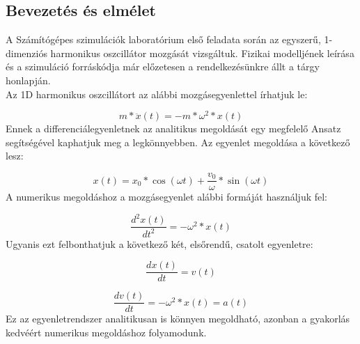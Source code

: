 \begin{multicols}{2}
\section{Bevezetés és elmélet} \label{sec:1}
A Számítógépes szimulációk laboratórium első feladata során az egyszerű, 1-dimenziós harmonikus oszcillátor mozgását vizsgáltuk. Fizikai modelljének leírása és a szimuláció forráskódja már előzetesen a rendelkezésünkre állt a tárgy honlapján\cite{szamszin}. \\
Az 1D harmonikus oszcillátort az alábbi mozgásegyenlettel írhatjuk le:

\begin{equation} \label{eq:1.1}
    m * \ddot{x} \left( t \right)  = - m * \omega^{2} * x \left( t \right)
\end{equation}
Ennek a differenciálegyenletnek az analitikus megoldását egy megfelelő Ansatz segítségével kaphatjuk meg a legkönnyebben. Az egyenlet megoldása a következő lesz:

\begin{equation} \label{eq:1.2}
    x \left( t \right)  = x_{0} * \cos(\omega t) + \frac{v_{0}}{\omega} * \sin(\omega t)
\end{equation}
A numerikus megoldáshoz a mozgásegyenlet alábbi formáját használjuk fel:

\begin{equation} \label{eq:1.3}
    \frac{d^{2} x \left( t \right) }{d t^{2}} = - \omega^{2} * x \left( t \right) 
\end{equation}
Ugyanis ezt felbonthatjuk a következő két, elsőrendű, csatolt egyenletre:

\begin{equation} \label{eq:1.4}
    \frac{dx \left( t \right)}{dt} = v \left( t \right) 
\end{equation}

\begin{equation} \label{eq:1.5}
    \frac{dv \left( t \right)}{dt} = - \omega^{2} * x \left( t \right) = a \left( t \right)
\end{equation}
Ez az egyenletrendszer analitikusan is könnyen megoldható, azonban a gyakorlás kedvéért numerikus megoldáshoz folyamodunk.


\end{multicols}
